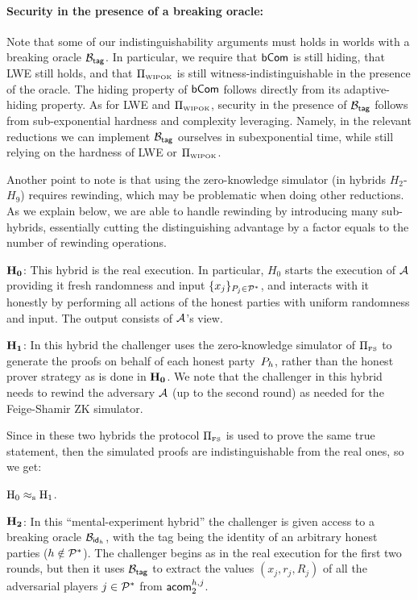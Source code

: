 \paragraph{Security in the presence of a breaking oracle:}
Note that some of our indistinguishability arguments must holds in worlds with a breaking oracle $\calB_{\tagg}$. In particular, we require that $\Com$ is still hiding, that LWE still holds, and that $\Pi_{\WIPOK}$ is still witness-indistinguishable in the presence of the oracle. The hiding property of $\Com$ follows directly from its adaptive-hiding property. As for LWE and $\Pi_{\WIPOK}$, security in the presence of $\calB_{\tagg}$ follows from sub-exponential hardness and complexity leveraging. Namely, in the relevant reductions we can implement $\calB_{\tagg}$ ourselves in subexponential time, while still relying on the hardness of LWE or $\Pi_{\WIPOK}$.

Another point to note is that using the zero-knowledge simulator (in hybrids $H_2$-$H_9$) requires rewinding, which may be problematic when doing other reductions. As we explain below, we are able to handle rewinding by introducing many sub-hybrids, essentially cutting the distinguishing advantage by a factor equals to the number of rewinding operations.


\BDE
\item{$\bf H_0$:} This hybrid is the real execution. In particular, $H_0$ starts the execution of $\cA$ providing it fresh randomness and input $\{x_j\}_{P_j \in\ccP^* }$, and interacts with it honestly by performing all actions of the honest parties with uniform randomness and input. The output consists of $\cA$'s view.


\smallskip
\item{$\bf H_1$:} In this hybrid the challenger uses the zero-knowledge simulator of $\Pi_{\FLS}$ to generate the proofs on behalf of each honest party~$\P_h$, rather than the honest prover strategy as is done in ${\bf H_0}$.
  We note that the challenger in this hybrid needs to rewind the adversary $\cA$ (up to the second round) as needed for the Feige-Shamir ZK simulator.

  Since in these two hybrids the protocol $\Pi_{\FLS}$ is used to prove the same true statement, then the simulated proofs are indistinguishable from the real ones, so we get:
  
\BL $\Hyb{0} \statind  \Hyb{1}$.\EL


\smallskip
\item{$\bf H_2$:} In this ``mental-experiment hybrid'' the challenger is given access to a breaking oracle $\calB_{\id_h}$, with the tag being the identity of an arbitrary honest parties ($h\notin\ccP^*$).
  The challenger begins as in the real execution for the first two rounds, but then it uses $\calB_{\tagg}$ to extract the values $(x_j,r_j,R_j)$ of all the adversarial players $j\in\ccP^*$ from $\nm_2^{h,j}$.

